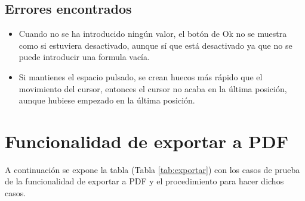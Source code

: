 \subsection{Errores encontrados}
\label{errores:mates}
\begin{itemize}
    \item Cuando no se ha introducido ningún valor, el botón de Ok no se muestra como si estuviera desactivado, aunque sí que está desactivado ya que no se puede introducir una formula vacía.
    \item Si mantienes el espacio pulsado, se crean huecos más rápido que el movimiento del cursor, entonces el cursor no acaba en la última posición, aunque hubiese empezado en la última posición.
\end{itemize}

\section{Funcionalidad de exportar a PDF}
\label{planPruebas:exportar}
A continuación se expone la tabla (Tabla \ref{tab:exportar}) con los casos de prueba de la funcionalidad de exportar a PDF y el procedimiento para hacer dichos casos.

